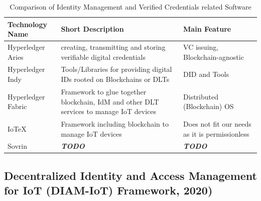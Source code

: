 \begin{table}
	\caption{Comparison of Identity Management and Verified Credentials related Software}
	\label{tab:Comparison of Identity Management and Verified Credentials related Software}
	\begin{center}
		\begin{tabular}[c]{|l|p{6cm}|p{6cm}|}
			\hline
			\textbf{Technology Name}                                                                &
			Short Description                                                                       &
			Main Feature                                                                              \\
			\hline
			Hyperledger Aries \cite{hyperledger:wiki}                                               &
			creating, transmitting and storing verifiable digital credentials                       &
			VC issuing, Blockchain-agnostic                                                           \\
			\hline
			Hyperledger Indy \cite{hyperledger:wiki}                                                &
			Tools/Libraries for providing digital IDs rooted on Blockchains or DLTs                 &
			DID and Tools                                                                             \\
			\hline
			Hyperledger Fabric \cite{hyperledger:fabric:docs}                                       &
			Framework to glue together blockchain, IdM and other DLT services to manage IoT devices &
			Distributed (Blockchain) OS                                                               \\
			\hline
			IoTeX \cite{iotex-bc-platform}                                                          &
			Framework including blockchain to manage IoT devices                                    &
			Does not fit our needs as it is permissionless                                            \\
			\hline
			Sovrin                                                                                  &
			\textbf{\textit{TODO}}                                                                  &
			\textbf{\textit{TODO}}                                                                    \\
			\hline
		\end{tabular}
	\end{center}
\end{table}

\subsection{Decentralized Identity and Access Management for IoT (DIAM-IoT) Framework, 2020)} %
\label{sub:Decentralized Identity and Access Management for IoT}

